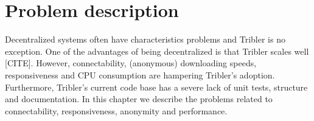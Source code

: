 \chapter{Problem description}
\label{chp:problem-description}
Decentralized systems often have characteristics problems and Tribler is no exception.
One of the advantages of being decentralized is that Tribler scales well [CITE].
However, connectability, (anonymous) downloading speeds, responsiveness and CPU consumption are hampering Tribler's adoption.
Furthermore, Tribler's current code base has a severe lack of unit tests, structure and documentation.
In this chapter we describe the problems related to connectability, responsiveness, anonymity and performance.



